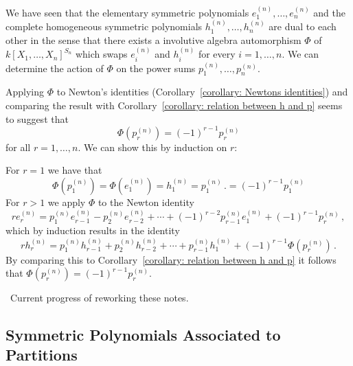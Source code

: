 \begin{fluff}
  We have seen that the elementary symmetric polynomials $e^{(n)}_1, \dotsc, e^{(n)}_n$ and the complete homogeneous symmetric polynomials $h^{(n)}_1, \dotsc, h^{(n)}_n$ are dual to each other in the sense that there exists a involutive algebra automorphism $\Phi$ of $k[X_1, \dotsc, X_n]^{S_n}$ which swaps $e^{(n)}_i$ and $h^{(n)}_i$ for every $i = 1, \dotsc, n$.
  We can determine the action of $\Phi$ on the power sums $p^{(n)}_1, \dotsc, p^{(n)}_n$.
  
  Applying $\Phi$ to Newton’s identities (Corollary~\ref{corollary: Newtons identities}) and comparing the result with Corollary~\ref{corollary: relation between h and p} seems to suggest that
  \[
      \Phi\left( p^{(n)}_r \right)
    = (-1)^{r-1} p^{(n)}_r
  \]
  for all $r = 1, \dotsc, n$.
  We can show this by induction on $r$:
  
  For $r = 1$ we have that
  \[
      \Phi\left( p^{(n)}_1 \right)
    = \Phi\left( e^{(n)}_1 \right)
    = h^{(n)}_1
    = p^{(n)}_1 \,.
    = (-1)^{r-1} p^{(n)}_1
  \]
  For $r > 1$ we apply $\Phi$ to the Newton identity
  \[
      r e^{(n)}_r
    =   p^{(n)}_1 e^{(n)}_{r-1}
      - p^{(n)}_2 e^{(n)}_{r-2}
      + \dotsb
      + (-1)^{r-2}  p^{(n)}_{r-1} e^{(n)}_1
      + (-1)^{r-1}  p^{(n)}_r \,,
  \]
  which by induction results in the identity
  \[
      r h^{(n)}_r
    =   p^{(n)}_1 h^{(n)}_{r-1}
      + p^{(n)}_2 h^{(n)}_{r-2}
      + \dotsb
      + p^{(n)}_{r-1} h^{(n)}_1
      + (-1)^{r-1} \Phi\left( p^{(n)}_r \right) \,.
  \]
  By comparing this to Corollary~\ref{corollary: relation between h and p} it follows that $\Phi( p^{(n)}_r ) = (-1)^{r-1} p^{(n)}_r$.
\end{fluff}


\noindent\hrulefill \, Current progress of reworking these notes. \hrulefill





\subsection{Symmetric Polynomials Associated to Partitions}

















